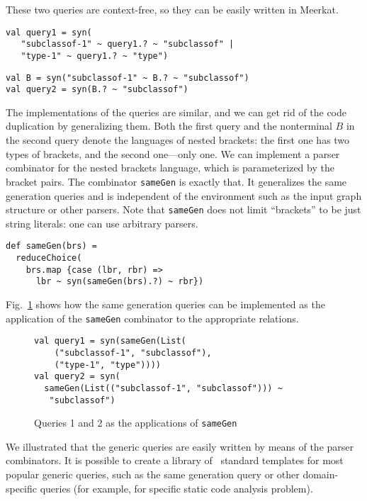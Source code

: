 These two queries are context-free, so they can be easily written in Meerkat.


\begin{lstlisting}
val query1 = syn(
   "subclassof-1" ~ query1.? ~ "subclassof" |
   "type-1" ~ query1.? ~ "type")
\end{lstlisting}

\begin{lstlisting}
val B = syn("subclassof-1" ~ B.? ~ "subclassof")
val query2 = syn(B.? ~ "subclassof")
\end{lstlisting}

The implementations of the queries are similar, and we can get rid of the code duplication by generalizing them.
Both the first query and the nonterminal $B$ in the second query denote the languages of nested brackets: the first one has two types of brackets, and the second one---only one.
We can implement a parser combinator for the nested brackets language, which is parameterized by the bracket pairs.
The combinator \lstinline{sameGen} is exactly that.
It generalizes the same generation queries and is independent of the environment such as the input graph structure or other parsers.
Note that \lstinline{sameGen} does not limit ``brackets'' to be just string literals: one can use arbitrary parsers.


\begin{lstlisting}
def sameGen(brs) =
  reduceChoice(
    brs.map {case (lbr, rbr) =>
      lbr ~ syn(sameGen(brs).?) ~ rbr})
\end{lstlisting}

Fig.~\ref{fig:queryGen} shows how the same generation queries can be implemented as the application of the \lstinline{sameGen} combinator to the appropriate relations.

\begin{figure}[!h]
\begin{lstlisting}
val query1 = syn(sameGen(List(
    ("subclassof-1", "subclassof"),
    ("type-1", "type"))))
val query2 = syn(
  sameGen(List(("subclassof-1", "subclassof"))) ~
   "subclassof")
\end{lstlisting}
\caption{Queries 1 and 2 as the applications of \lstinline{sameGen}}
\label{fig:queryGen}
\end{figure}


We illustrated that the generic queries are easily written by means of the parser combinators.
It is possible to create a library of \ standard templates for most popular generic queries, such as the same generation query or other domain-specific queries (for example, for specific static code analysis problem).


